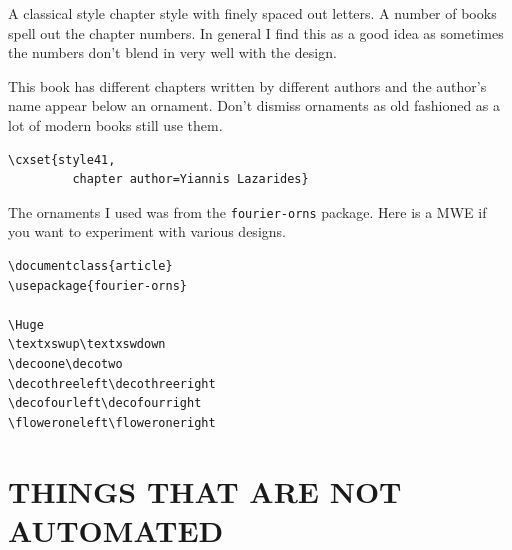 A classical style chapter style with finely spaced out letters. A number of books spell out the chapter numbers. In general I find this as a good idea as sometimes the numbers don't blend in very well with the design.

\begin{figure}[ht]
\centering
{}
\end{figure}

This book has different chapters written by different authors and the author's name appear below an ornament. Don't dismiss ornaments as old fashioned as a lot of modern books still use them.

\begin{lstlisting}
\cxset{style41,
         chapter author=Yiannis Lazarides}
\end{lstlisting}

The ornaments I used was from the \texttt{fourier-orns} package. Here is a MWE if you want to experiment with various designs.


\begin{lstlisting}
\documentclass{article}
\usepackage{fourier-orns}

\Huge
\textxswup\textxswdown
\decoone\decotwo
\decothreeleft\decothreeright
\decofourleft\decofourright
\floweroneleft\floweroneright

\end{lstlisting}

\section{THINGS THAT ARE NOT AUTOMATED}

